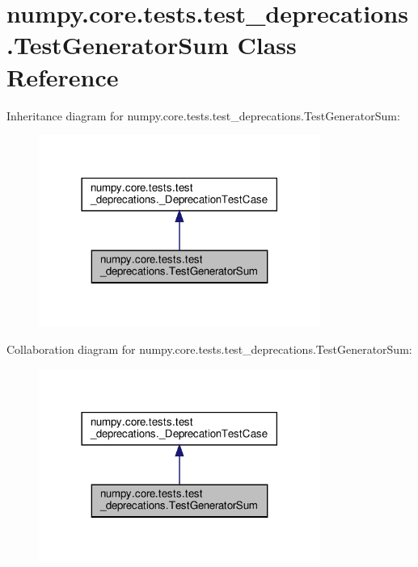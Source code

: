 \hypertarget{classnumpy_1_1core_1_1tests_1_1test__deprecations_1_1TestGeneratorSum}{}\section{numpy.\+core.\+tests.\+test\+\_\+deprecations.\+Test\+Generator\+Sum Class Reference}
\label{classnumpy_1_1core_1_1tests_1_1test__deprecations_1_1TestGeneratorSum}


Inheritance diagram for numpy.\+core.\+tests.\+test\+\_\+deprecations.\+Test\+Generator\+Sum\+:
\nopagebreak
\begin{figure}[H]
\begin{center}
\leavevmode
\includegraphics[width=261pt]{classnumpy_1_1core_1_1tests_1_1test__deprecations_1_1TestGeneratorSum__inherit__graph}
\end{center}
\end{figure}


Collaboration diagram for numpy.\+core.\+tests.\+test\+\_\+deprecations.\+Test\+Generator\+Sum\+:
\nopagebreak
\begin{figure}[H]
\begin{center}
\leavevmode
\includegraphics[width=261pt]{classnumpy_1_1core_1_1tests_1_1test__deprecations_1_1TestGeneratorSum__coll__graph}
\end{center}
\end{figure}
